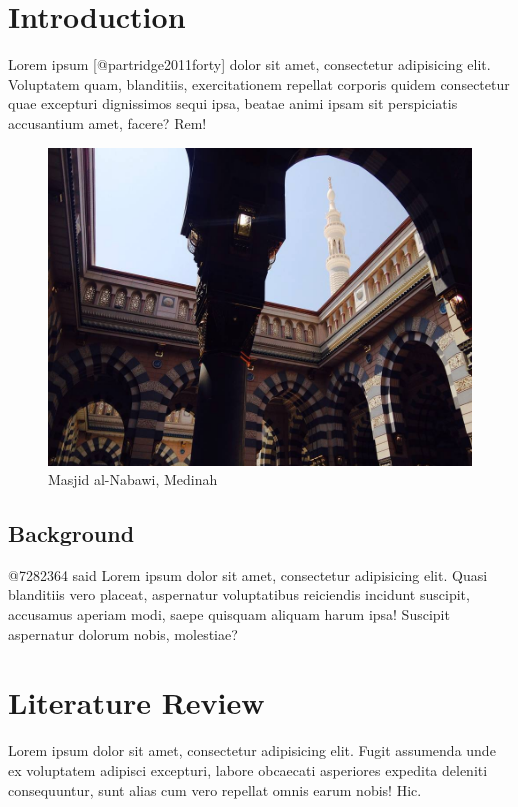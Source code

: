 \documentclass[]{article}
\date{}
\begin{document}
\section{Introduction}\label{introduction}

Lorem ipsum {[}@partridge2011forty{]} dolor sit amet, consectetur
adipisicing elit. Voluptatem quam, blanditiis, exercitationem repellat
corporis quidem consectetur quae excepturi dignissimos sequi ipsa,
beatae animi ipsam sit perspiciatis accusantium amet, facere? Rem!

\begin{figure}
\centering
\includegraphics{figure.jpg}
\caption{Masjid al-Nabawi, Medinah}
\end{figure}

\subsection{Background}\label{background}

@7282364 said Lorem ipsum dolor sit amet, consectetur adipisicing elit.
Quasi blanditiis vero placeat, aspernatur voluptatibus reiciendis
incidunt suscipit, accusamus aperiam modi, saepe quisquam aliquam harum
ipsa! Suscipit aspernatur dolorum nobis, molestiae?

\section{Literature Review}\label{literature-review}

Lorem ipsum dolor sit amet, consectetur adipisicing elit. Fugit
assumenda unde ex voluptatem adipisci excepturi, labore obcaecati
asperiores expedita deleniti consequuntur, sunt alias cum vero repellat
omnis earum nobis! Hic.
\end{document}
